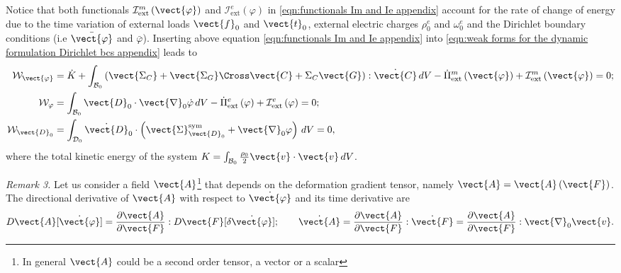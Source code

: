 Notice that both functionals $\mathcal{I}^m_{\text{ext}}\left(\vect{\varphi}\right)$ and $\mathcal{I}^e_{\text{ext}}\left({\varphi}\right)$ in \eqref{eqn:functionals Im and Ie appendix} account for the rate of change of energy due to the time variation of external loads $\vect{f}_0$ and $\vect{t}_0$, external electric charges $\rho^e_0$ and $\omega^e_0$ and the Dirichlet boundary conditions (i.e $\bar{\vect{\varphi}}$ and $\bar{\varphi}$). Inserting above equation \eqref{eqn:functionals Im and Ie appendix} into \eqref{eqn:weak forms for the dynamic formulation Dirichlet bcs appendix} leads to
%
\begin{equation}\label{eqn:Wvarphi conservation of energy appendix}
\begin{aligned}
\mathcal{W}_{\vect{\varphi}}& = \dot{K} + \int_{\mathcal{B}_0}\left(\vect{\Sigma_C} + \vect{\Sigma_G}\Cross\vect{C} + \Sigma_C\vect{G}\right):\dot{\vect{C}}\,dV-  \dot{\Pi}^m_{\text{ext}}\left(\vect{\varphi}\right) + \mathcal{I}^m_{\text{ext}}\left(\vect{\varphi}\right) = 0;\\
%
\mathcal{W}_{{\varphi}}& = \int_{\mathcal{B}_0}\vect{D}_0\cdot\vect{\nabla}_0\dot{\varphi}\,dV - \dot{\Pi}^e_{\text{ext}}\left(\varphi\right) + \mathcal{I}^e_{\text{ext}}\left(\varphi\right) = 0;\\
%
\mathcal{W}_{\vect{D}_0}& =  \int_{\mathcal{D}_0}\dot{\vect{D}}_0\cdot\left(\vect{\Sigma}^{\text{sym}}_{\vect{D}_0} + \vect{\nabla}_0\varphi\right)\,dV = 0,
\end{aligned}
\end{equation}
%
where the total kinetic energy of the system $K= \int_{\mathcal{B}_0}\frac{\rho_0}{2}\vect{v}\cdot\vect{v}\,dV$.

\noindent\makebox[\linewidth]{\rule{\textwidth}{0.4pt}}

\noindent \textit{Remark 3.} Let us consider a field $\vect{A}$\footnote{ In general $\vect{A}$ could be a second order tensor, a vector or a scalar} that depends on the deformation gradient tensor, namely $\vect{A} = \vect{A}\left(\vect{F}\right)$. The directional derivative of $\vect{A}$ with respect to $\dot{\vect{\varphi}}$ and its time derivative are
%
\begin{equation}
D\vect{A}[\dot{\vect{\varphi}}] = \frac{\partial\vect{A}}{\partial\vect{F}}:D\vect{F}[\delta\dot{\vect{\varphi}}];\qquad
\dot{\vect{A}} = \frac{\partial\vect{A}}{\partial\vect{F}}:\dot{\vect{F}} = \frac{\partial\vect{A}}{\partial\vect{F}}:\vect{\nabla}_0\vect{v}.
\end{equation}

